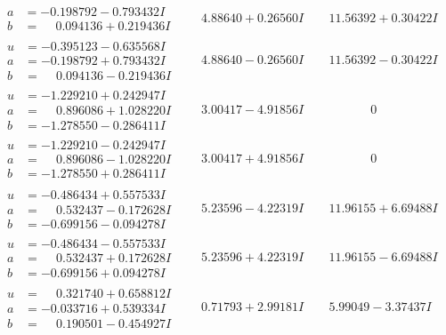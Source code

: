 \documentclass[1p]{elsarticle_modified}
\theoremstyle{definition}
\begin{document}
$$\begin{array}{c|c|c}
\begin{aligned}
a &= -0.198792 - 0.793432 I \\
b &= \phantom{-}0.094136 + 0.219436 I\end{aligned}
 & \phantom{-}4.88640 + 0.26560 I & \phantom{-}11.56392 + 0.30422 I \\ \hline\begin{aligned}
u &= -0.395123 - 0.635568 I \\
a &= -0.198792 + 0.793432 I \\
b &= \phantom{-}0.094136 - 0.219436 I\end{aligned}
 & \phantom{-}4.88640 - 0.26560 I & \phantom{-}11.56392 - 0.30422 I \\ \hline\begin{aligned}
u &= -1.229210 + 0.242947 I \\
a &= \phantom{-}0.896086 + 1.028220 I \\
b &= -1.278550 - 0.286411 I\end{aligned}
 & \phantom{-}3.00417 - 4.91856 I & \phantom{-0.000000 } 0 \\ \hline\begin{aligned}
u &= -1.229210 - 0.242947 I \\
a &= \phantom{-}0.896086 - 1.028220 I \\
b &= -1.278550 + 0.286411 I\end{aligned}
 & \phantom{-}3.00417 + 4.91856 I & \phantom{-0.000000 } 0 \\ \hline\begin{aligned}
u &= -0.486434 + 0.557533 I \\
a &= \phantom{-}0.532437 - 0.172628 I \\
b &= -0.699156 - 0.094278 I\end{aligned}
 & \phantom{-}5.23596 - 4.22319 I & \phantom{-}11.96155 + 6.69488 I \\ \hline\begin{aligned}
u &= -0.486434 - 0.557533 I \\
a &= \phantom{-}0.532437 + 0.172628 I \\
b &= -0.699156 + 0.094278 I\end{aligned}
 & \phantom{-}5.23596 + 4.22319 I & \phantom{-}11.96155 - 6.69488 I \\ \hline\begin{aligned}
u &= \phantom{-}0.321740 + 0.658812 I \\
a &= -0.033716 + 0.539334 I \\
b &= \phantom{-}0.190501 - 0.454927 I\end{aligned}
 & \phantom{-}0.71793 + 2.99181 I & \phantom{-}5.99049 - 3.37437 I \\ \hline\begin{aligned}

\end{aligned}
\end{array}$$
\end{document}
